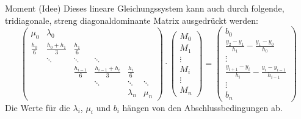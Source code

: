 \begin{bonus}{Moment (Idee)}
    Dieses lineare Gleichungssystem kann auch durch folgende, tridiagonale, streng diagonaldominante Matrix ausgedrückt werden: 
    \[
        \begin{pmatrix}
            \mu_{0}         & \lambda_{0}           &                   &                         &                  &          \\
            \frac{h_{0}}{6} & \frac{h_{0}+h_{1}}{3} & \frac {h_{1}}{6}  &                         &                  &          \\
                            & \ddots                & \ddots            & \ddots                  &                  &          \\
                            &                       & \frac{h_{i-1}}{6} & \frac{h_{i-1}+h_{i}}{3} & \frac {h_{i}}{6} &          \\
                            &                       &                   & \ddots                  & \ddots           & \ddots   \\
                            &                       &                   &                         & \lambda _{n}     & \mu _{n}
        \end{pmatrix}
        \cdot 
        \begin{pmatrix}
            M_{0} \\ M_{1} \\ \vdots \\ M_{i} \\ \vdots \\ M_{n}
        \end{pmatrix}
        =
        \begin{pmatrix}
            b_{0}                                                       \\
            \frac{y_{2}-y_{1}}{h_{1}} - \frac{y_{1}-y_{0}}{h_{0}}       \\
            \vdots                                                      \\
            \frac{y_{i+1}-y_{i}}{h_{i}} - \frac{y_{i}-y_{i-1}}{h_{i-1}} \\
            \vdots                                                      \\
            b_{n}
        \end{pmatrix}
    \]
    Die Werte für die $\lambda_i$, $\mu_i$ und $b_i$ hängen von den Abschlussbedingungen ab.
\end{bonus}

